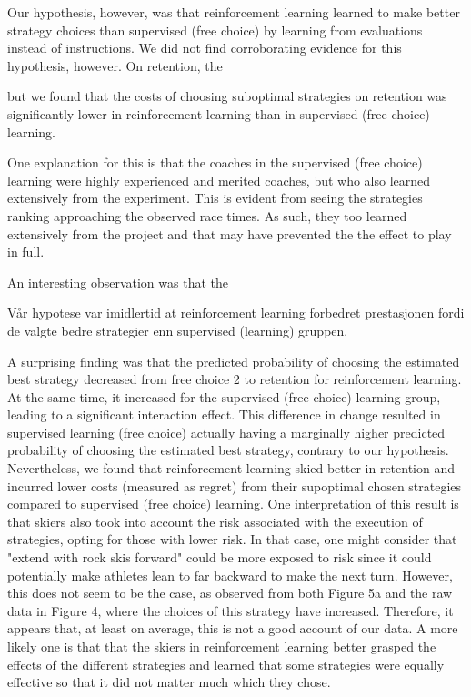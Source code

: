\documentclass{article}
\begin{document}
Our hypothesis, however, was that reinforcement learning learned to make better strategy choices than supervised (free choice) by learning from evaluations instead of instructions. We did not find corroborating evidence for this hypothesis, however. On retention, the

but we found that the costs of choosing suboptimal strategies on retention was significantly lower in reinforcement learning than in supervised (free choice) learning. 






One explanation for this is that the coaches in the supervised (free choice) learning were highly experienced and merited coaches, but who also learned extensively from the experiment. This is evident from seeing the strategies ranking approaching the observed race times. As such, they too learned extensively from the project and that may have prevented the the effect to play in full. 

An interesting observation was that the 




Vår hypotese var imidlertid at reinforcement learning forbedret prestasjonen fordi de valgte bedre strategier enn supervised (learning) gruppen. 


A surprising finding was that the predicted probability of choosing the estimated best strategy decreased from free choice 2 to retention for reinforcement learning. At the same time, it increased for the supervised (free choice) learning group, leading to a significant interaction effect. This difference in change resulted in supervised learning (free choice) actually having a marginally higher predicted probability of choosing the estimated best strategy, contrary to our hypothesis. Nevertheless, we found that reinforcement learning skied better in retention and incurred lower costs (measured as regret) from their supoptimal chosen strategies compared to supervised (free choice) learning. One interpretation of this result is that skiers also took into account the risk associated with the execution of strategies, opting for those with lower risk. In that case, one might consider that "extend with rock skis forward" could be more exposed to risk since it could potentially make athletes lean to far backward to make the next turn.  However, this does not seem to be the case, as observed from both Figure 5a and the raw data in Figure 4, where the choices of this strategy have increased. Therefore, it appears that, at least on average, this is not a good account of our data. A more likely one is that that the skiers in reinforcement learning better grasped the effects of the different strategies and learned that some strategies were equally effective so that it did not matter much which they chose.
\end{document}
